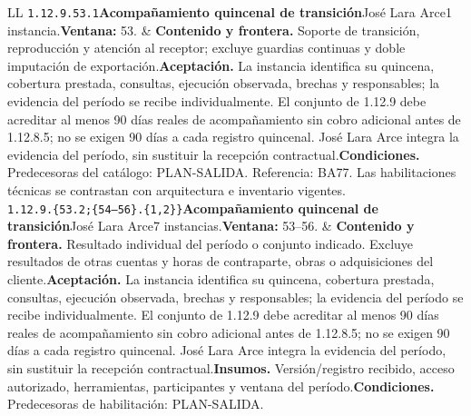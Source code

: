 \begin{longtable}{L{\tabcolsep\relax}L{\tabcolsep\relax}}
\texttt{1.\allowbreak{}12.\allowbreak{}9.\allowbreak{}53.\allowbreak{}1}\newline{}\textbf{Acompañamiento quincenal de transición}\newline{}José Lara Arce\newline{}1 instancia.\newline{}\textbf{Ventana:} 53. & \textbf{Contenido y frontera.} Soporte de transición, reproducción y atención al receptor; excluye guardias continuas y doble imputación de exportación.\newline{}\textbf{Aceptación.} La instancia identifica su quincena, cobertura prestada, consultas, ejecución observada, brechas y responsables; la evidencia del período se recibe individualmente. El conjunto de 1.12.9 debe acreditar al menos 90 días reales de acompañamiento sin cobro adicional antes de 1.12.8.5; no se exigen 90 días a cada registro quincenal. José Lara Arce integra la evidencia del período, sin sustituir la recepción contractual.\newline{}\textbf{Condiciones.} Predecesoras del catálogo: PLAN-SALIDA. Referencia: BA77. Las habilitaciones técnicas se contrastan con arquitectura e inventario vigentes.\\\hline
\texttt{1.\allowbreak{}12.\allowbreak{}9.\allowbreak{}\{53.\allowbreak{}2;\allowbreak{}\{54--56\}.\allowbreak{}\{1,\allowbreak{}2\}\}}\newline{}\textbf{Acompañamiento quincenal de transición}\newline{}José Lara Arce\newline{}7 instancias.\newline{}\textbf{Ventana:} 53--56. & \textbf{Contenido y frontera.} Resultado individual del período o conjunto indicado. Excluye resultados de otras cuentas y horas de contraparte, obras o adquisiciones del cliente.\newline{}\textbf{Aceptación.} La instancia identifica su quincena, cobertura prestada, consultas, ejecución observada, brechas y responsables; la evidencia del período se recibe individualmente. El conjunto de 1.12.9 debe acreditar al menos 90 días reales de acompañamiento sin cobro adicional antes de 1.12.8.5; no se exigen 90 días a cada registro quincenal. José Lara Arce integra la evidencia del período, sin sustituir la recepción contractual.\newline{}\textbf{Insumos.} Versión/registro recibido, acceso autorizado, herramientas, participantes y ventana del período.\newline{}\textbf{Condiciones.} Predecesoras de habilitación: PLAN-SALIDA.\\\hline

\end{longtable}
